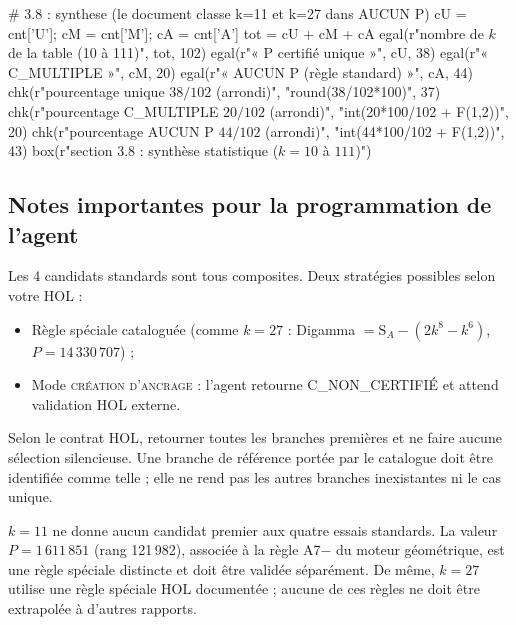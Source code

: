 \documentclass[11pt,a4paper]{article}
\newcommand{\SA}{\mathrm{S}_A}
\begin{document}
\begin{pycode}
# 3.8 : synthese (le document classe k=11 et k=27 dans AUCUN P)
cU = cnt['U']; cM = cnt['M']; cA = cnt['A']
tot = cU + cM + cA
egal(r"nombre de $k$ de la table (10 à 111)", tot, 102)
egal(r"« P certifié unique »", cU, 38)
egal(r"« C\_MULTIPLE »", cM, 20)
egal(r"« AUCUN P (règle standard) »", cA, 44)
chk(r"pourcentage unique $38/102$ (arrondi)", "round(38/102*100)", 37)
chk(r"pourcentage C\_MULTIPLE $20/102$ (arrondi)", "int(20*100/102 + F(1,2))", 20)
chk(r"pourcentage AUCUN P $44/102$ (arrondi)", "int(44*100/102 + F(1,2))", 43)
box(r"section 3.8 : synthèse statistique ($k=10$ à $111$)")
\end{pycode}


\subsection{Notes importantes pour la programmation de l'agent}

\vspace{0.3cm}
\begin{boitealerte}
Les 4 candidats standards sont tous composites. Deux stratégies possibles selon
votre HOL :
\begin{itemize}[nosep]
  \item Règle spéciale cataloguée (comme $k=27$ : Digamma $= \SA - (2k^{8}-k^{6})$, $P = 14\,330\,707$) ;
  \item Mode \textsc{création d'ancrage} : l'agent retourne C\_NON\_CERTIFIÉ et attend validation HOL externe.
\end{itemize}
\end{boitealerte}
\vspace{0.6cm}

\vspace{0.3cm}
\begin{boitenote}
Selon le contrat HOL, retourner toutes les branches premières et ne faire
aucune sélection silencieuse. Une branche de référence portée par le catalogue
doit être identifiée comme telle ; elle ne rend pas les autres branches
inexistantes ni le cas unique.
\end{boitenote}

\vspace{0.6cm}

\vspace{0.3cm}
\begin{boitenote}
$k=11$ ne donne aucun candidat premier aux quatre essais standards. La valeur
$P=1\,611\,851$ (rang 121\,982), associée à la règle A7$-$ du moteur géométrique,
est une règle spéciale distincte et doit être validée séparément. De même,
$k=27$ utilise une règle spéciale HOL documentée ; aucune de ces règles ne doit
être extrapolée à d'autres rapports.
\end{boitenote}
\end{document}
